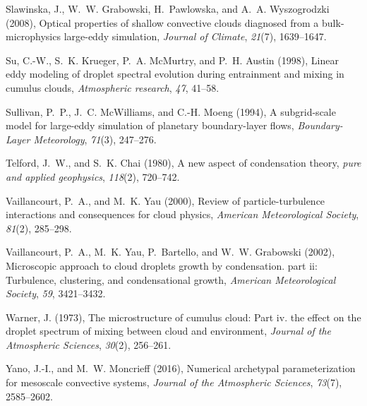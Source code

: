 \documentclass[draft,linenumbers]{AGUJournal}
\begin{document}
\begin{thebibliography}{60}
Slawinska, J., W.~W. Grabowski, H.~Pawlowska, and A.~A. Wyszogrodzki (2008),
  Optical properties of shallow convective clouds diagnosed from a
  bulk-microphysics large-eddy simulation, \textit{Journal of Climate},
  \textit{21}(7), 1639--1647.

Su, C.-W., S.~K. Krueger, P.~A. McMurtry, and P.~H. Austin (1998), Linear eddy
  modeling of droplet spectral evolution during entrainment and mixing in
  cumulus clouds, \textit{Atmospheric research}, \textit{47}, 41--58.

Sullivan, P.~P., J.~C. McWilliams, and C.-H. Moeng (1994), A subgrid-scale
  model for large-eddy simulation of planetary boundary-layer flows,
  \textit{Boundary-Layer Meteorology}, \textit{71}(3), 247--276.

Telford, J.~W., and S.~K. Chai (1980), A new aspect of condensation theory,
  \textit{pure and applied geophysics}, \textit{118}(2), 720--742.

Vaillancourt, P.~A., and M.~K. Yau (2000), Review of particle-turbulence
  interactions and consequences for cloud physics, \textit{American
  Meteorological Society}, \textit{81}(2), 285--298.

Vaillancourt, P.~A., M.~K. Yau, P.~Bartello, and W.~W. Grabowski (2002),
  Microscopic approach to cloud droplets growth by condensation. part ii:
  Turbulence, clustering, and condensational growth, \textit{American
  Meteorological Society}, \textit{59}, 3421--3432.

Warner, J. (1973), The microstructure of cumulus cloud: Part iv. the effect on
  the droplet spectrum of mixing between cloud and environment, \textit{Journal
  of the Atmospheric Sciences}, \textit{30}(2), 256--261.

Yano, J.-I., and M.~W. Moncrieff (2016), Numerical archetypal parameterization
  for mesoscale convective systems, \textit{Journal of the Atmospheric
  Sciences}, \textit{73}(7), 2585--2602.


\end{thebibliography}
\end{document}
